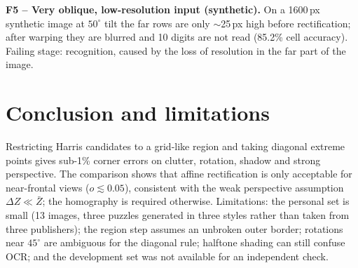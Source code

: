 \documentclass[conference]{IEEEtran}%
\begin{document}
\textbf{F5 -- Very oblique, low-resolution input (synthetic).} On a 1600\,px
synthetic image at $50^\circ$ tilt the far rows are only $\sim$25\,px high
before rectification; after warping they are blurred and 10 digits are not read
(85.2\% cell accuracy). Failing stage: recognition, caused by
the loss of resolution in the far part of the image.

\section{Conclusion and limitations}
Restricting Harris candidates to a grid-like region and taking diagonal
extreme points gives sub-1\% corner errors on clutter, rotation, shadow and
strong perspective. The comparison shows that affine rectification is only
acceptable for near-frontal views ($o\lesssim0.05$), consistent with the weak
perspective assumption $\Delta Z\ll\bar Z$; the homography is required
otherwise. Limitations: the personal set is small (13 images, three puzzles
generated in three styles rather than taken from three publishers); the region
step assumes an unbroken
outer border; rotations near $45^\circ$ are ambiguous for the diagonal rule;
halftone shading can still confuse OCR; and the development set was not
available for an independent check.

\clearpage
\onecolumn
\appendix
\end{document}
